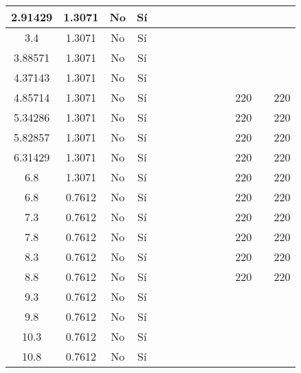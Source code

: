 \begin{table}[H]
{\begin{tabular}{|c|c|c|c|c|c|c|c|c|c|c|c|c|c|}
\hline
2.91429 & 1.3071 & No  & Sí  &     &     &     &     &     &     &     &     &     &  \bigstrut\\
\hline
3.4 & 1.3071 & No  & Sí  &     &     &     &     &     &     &     &     &     &  \bigstrut\\
\hline
3.88571 & 1.3071 & No  & Sí  &     &     &     &     &     &     &     &     &     &  \bigstrut\\
\hline
4.37143 & 1.3071 & No  & Sí  &     &     &     &     &     &     &     &     &     &  \bigstrut\\
\hline
4.85714 & 1.3071 & No  & Sí  &     &     &     &     &     &     &     & 220 &     & 220 \bigstrut\\
\hline
5.34286 & 1.3071 & No  & Sí  &     &     &     &     &     &     &     & 220 &     & 220 \bigstrut\\
\hline
5.82857 & 1.3071 & No  & Sí  &     &     &     &     &     &     &     & 220 &     & 220 \bigstrut\\
\hline
6.31429 & 1.3071 & No  & Sí  &     &     &     &     &     &     &     & 220 &     & 220 \bigstrut\\
\hline
6.8 & 1.3071 & No  & Sí  &     &     &     &     &     &     &     & 220 &     & 220 \bigstrut\\
\hline
6.8 & 0.7612 & No  & Sí  &     &     &     &     &     &     &     & 220 &     & 220 \bigstrut\\
\hline
7.3 & 0.7612 & No  & Sí  &     &     &     &     &     &     &     & 220 &     & 220 \bigstrut\\
\hline
7.8 & 0.7612 & No  & Sí  &     &     &     &     &     &     &     & 220 &     & 220 \bigstrut\\
\hline
8.3 & 0.7612 & No  & Sí  &     &     &     &     &     &     &     & 220 &     & 220 \bigstrut\\
\hline
8.8 & 0.7612 & No  & Sí  &     &     &     &     &     &     &     & 220 &     & 220 \bigstrut\\
\hline
9.3 & 0.7612 & No  & Sí  &     &     &     &     &     &     &     &     &     &  \bigstrut\\
\hline
9.8 & 0.7612 & No  & Sí  &     &     &     &     &     &     &     &     &     &  \bigstrut\\
\hline
10.3 & 0.7612 & No  & Sí  &     &     &     &     &     &     &     &     &     &  \bigstrut\\
\hline
10.8 & 0.7612 & No  & Sí  &     &     &     &     &     &     &     &     &     &  \bigstrut\\
\hline

\end{tabular}}
\end{table}
